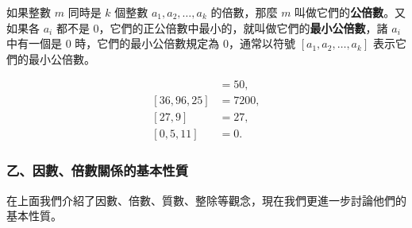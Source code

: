 \begin{definition*}
如果整數 $m$ 同時是 $k$ 個整數 $a_1, a_2, \dots, a_k$ 的倍數，那麼 $m$ 叫做它們的\textbf{公倍數}。又如果各 $a_i$ 都不是 $0$，它們的正公倍數中最小的，就叫做它們的\textbf{最小公倍數}，諸 $a_i$ 中有一個是 $0$ 時，它們的最小公倍數規定為 $0$，通常以符號 $[a_1, a_2, \dots, a_k]$ 表示它們的最小公倍數。
\end{definition*}

\begin{example}\label{ex:6-1-3}
\begin{align*}
  [10, 25] &= 50, \\
  [36, 96, 25] &= 7200, \\
  [27, 9] &= 27, \\
  [0, 5, 11] &= 0.
\end{align*}
\end{example}

\subsubsection*{乙、因數、倍數關係的基本性質}\label{subsec:6-1-b}

在上面我們介紹了因數、倍數、質數、整除等觀念，現在我們更進一步討論他們的基本性質。

